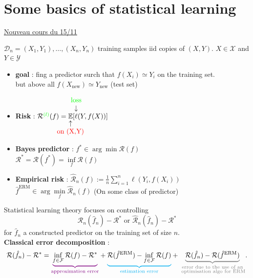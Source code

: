 \chapter{Some basics of statistical learning}

\underline{Nouveau cours du 15/11} 

$\mathcal{D}_n = {(X_1, Y_1), \dots, (X_n,Y_n)}$ training samples iid copies of $(X,Y)$. $X \in \mathcal{X}$ and $Y \in \mathcal{Y}$ 

\begin{itemize}
    \item \textbf{goal} : fing a predictor surch that $f(X_i) \simeq Y_i$ on the training set. \\
    but above all $f(X_{\text{new}}) \simeq Y_{\text{new}}$ (test set) 
    \item \textbf{Risk} : $\mathcal{R}^{\textcolor{green}{(l)} }(f) = \underarrow[\mathbb{E}][\uparrow]{\textcolor{red}{on (X,Y)}} [ \overarrow[\ell][\downarrow]{\textcolor{green}{loss}}(Y, f(X))]$
    \item \textbf{Bayes predictor} : $f^\ast  \in \arg \min \mathcal{R}(f)$ \\
    $ \mathcal{R}^\ast = \mathcal{R}(f^\ast) = \inf \limits_{f} \mathcal{R}(f) $
    \item \textbf{Empirical risk} : $\hat{\mathcal{R}}_n (f) := \frac{1}{n} \sum \limits_{i=1}^{n} \ell (Y_i, f(X_i))$ \\
    $\hat{f}^{\text{ERM}} \in  \arg \min \limits_f \hat{\mathcal{R}}_n (f) $ (On some class of predictor)
\end{itemize}

Statistical learning theory focuses on controlling 
\[
    \mathcal{R}_n (\hat{f}_n) - \mathcal{R}^\ast  \text{  or  } \hat{\mathcal{R}}_n (\hat{f}_n) - \mathcal{R}^\ast
\]
for $\hat{f}_n$ a constructed predictor on the training set of size $n$. \\

\textbf{Classical error decomposition} :
\[
    \mathcal{R} (\hat{f}_n) - \mathcal{R}^\ast = 
    \textcolor{violet}{\underbrace{\color{black}\inf_{f \in \mathcal{F}} \mathcal{R}(f) - \mathcal{R}^\ast }_{\text{approximation error}} } 
    + \textcolor{cyan}{\underbrace{\color{black} \mathcal{R}(\hat{f}^\text{ERM}) - \inf_{f \in \mathcal{F}} \mathcal{R}(f) }_{\text{estimation error}} }
    +  \textcolor{gray}{\underbrace{\color{black} \mathcal{R} (\hat{f}_n) - \mathcal{R}(\hat{f}^\text{ERM}) }_{\substack{\text{error due to the use of an} \\ \text{ optimisation algo for ERM} } }}
.\]


